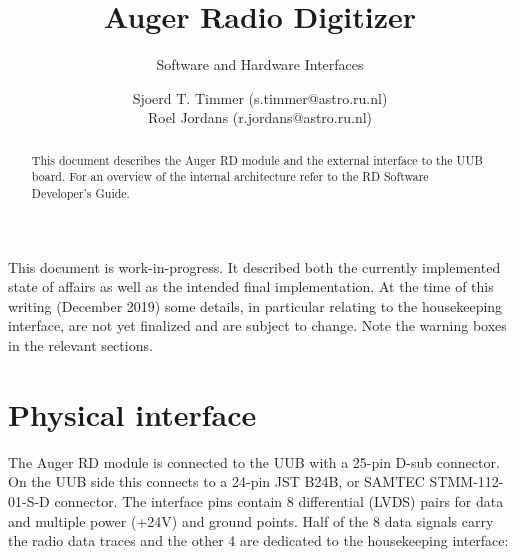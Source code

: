 \documentclass[a4paper,indent]{paper}
\title{Auger Radio Digitizer}
\subtitle{Software and Hardware Interfaces}
\author{%
  Sjoerd T. Timmer (s.timmer@astro.ru.nl)\\
  Roel Jordans (r.jordans@astro.ru.nl)}
\date{}
\begin{document}
\maketitle{}
\begin{abstract}
  This document describes the Auger \acf{RD} module and the external interface to the \acs{UUB} board.
  For an overview of the internal architecture refer to the RD Software Developer's Guide.
  \acresetall
\end{abstract}

\begin{mdframed}[linewidth=2pt,linecolor=orange,backgroundcolor=orange!10]%
  This document is work-in-progress.
  It described both the currently implemented state of affairs as well as the intended final implementation.
  At the time of this writing (December 2019) some details, in particular relating to the housekeeping interface, are not yet finalized and are subject to change. Note the warning boxes in the relevant sections. 
\end{mdframed}
  
\tableofcontents

\clearpage


\section{Physical interface}
The Auger \ac{RD} module is connected to the \ac{UUB} with a 25-pin D-sub connector.
On the \ac{UUB} side this connects to a 24-pin JST B24B, or SAMTEC STMM-112-01-S-D connector.
The interface pins contain 8 differential (LVDS) pairs for data and multiple power (+24V) and ground points.
Half of the 8 data signals carry the radio data traces and the other 4 are dedicated to the housekeeping interface:%
\end{document}
